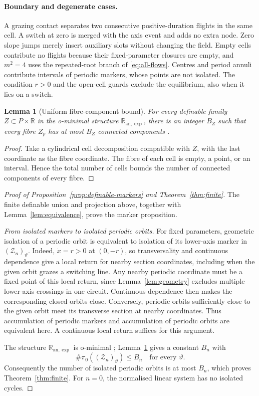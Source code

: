 \documentclass[11pt]{article}
\newtheorem{lemma}[theorem]{Lemma}
\theoremstyle{remark}
\newcommand{\R}{\mathbb R}
\newcommand{\Ranexp}{\mathbb R_{\mathrm{an},\exp}}
\begin{document}
\paragraph{Boundary and degenerate cases.}
A grazing contact separates two consecutive positive-duration flights
in the same cell.  A switch at zero is merged with the axis event and adds
no extra node.  Zero slope jumps merely insert auxiliary slots without
changing the field.  Empty cells contribute no flights because their
fixed-parameter closures are empty, and \(m^2=4\) uses the repeated-root
branch of \eqref{eq:all-flows}.  Centres and period annuli contribute
intervals of periodic markers, whose points are not isolated.  The
condition \(r>0\) and the open-cell guards exclude the equilibrium,
also when it lies on a switch.

\begin{lemma}[Uniform fibre-component bound]\label{lem:fibre-components}
For every definable family \(Z\subset P\times\R\) in the o-minimal
structure \(\Ranexp\), there is an integer \(B_Z\) such that every fibre
\(Z_p\) has at most \(B_Z\) connected components
\cite[Section~4.4]{vdm}.
\end{lemma}
\begin{proof}
Take a cylindrical cell decomposition compatible with \(Z\), with
the last coordinate as the fibre coordinate.  The fibre of each cell
is empty, a point, or an interval.  Hence the total number of cells
bounds the number of connected components of every fibre.
\end{proof}

\begin{proof}[Proof of Proposition~\ref{prop:definable-markers} and
Theorem~\ref{thm:finite}]
The finite definable union and projection above, together with
Lemma~\ref{lem:equivalence}, prove the marker proposition.

\emph{From isolated markers to isolated periodic orbits.}
For fixed parameters, geometric isolation of a periodic orbit is
equivalent to isolation of its lower-axis marker in
\((\mathcal Z_n)_\vartheta\).  Indeed, \(\dot x=r>0\) at
\((0,-r)\), so transversality and continuous dependence give a local
return for nearby section coordinates, including when the given orbit
grazes a switching line.  Any nearby periodic coordinate
must be a fixed point of this local return, since
Lemma~\ref{lem:geometry} excludes multiple lower-axis crossings in one
circuit.  Continuous dependence then makes the corresponding closed
orbits close.  Conversely, periodic orbits sufficiently close to the
given orbit meet its transverse section at nearby coordinates.
Thus accumulation of periodic markers and accumulation of periodic
orbits are equivalent here.  A continuous local return suffices for this
argument.

The structure \(\Ranexp\) is o-minimal
\cite[Corollary 5.13]{dmm}; Lemma~\ref{lem:fibre-components} gives a
constant \(B_n\) with
\[
 \#\pi_0((\mathcal Z_n)_\vartheta)\le B_n
 \quad\text{for every }\vartheta.
\]
Consequently the number of isolated periodic orbits is at most \(B_n\),
which proves Theorem~\ref{thm:finite}.  For \(n=0\), the normalised
linear system has no isolated cycles.
\end{proof}
\end{document}
